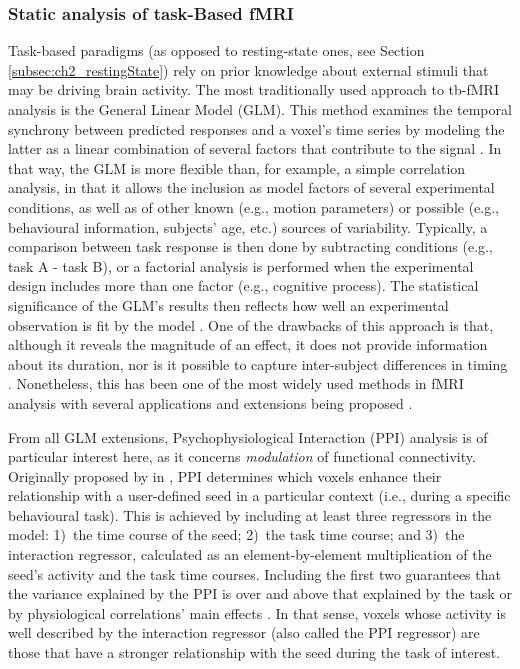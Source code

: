 \subsubsection{Static analysis of task-Based fMRI}

Task-based paradigms (as opposed to resting-state ones, see Section \ref{subsec:ch2_restingState}) rely on prior knowledge about external stimuli that may be driving brain activity. The most traditionally used approach to tb-fMRI analysis is the General Linear Model (GLM). This method examines the temporal synchrony between predicted responses and a voxel’s time series by modeling the latter as a linear combination of several factors that contribute to the signal \citep{Friston1995a}. In that way, the GLM is more flexible than, for example, a simple correlation analysis, in that it allows the inclusion as model factors of several experimental conditions, as well as of other known (e.g., motion parameters) or possible (e.g., behavioural information, subjects’ age, etc.) sources of variability. Typically, a comparison between task response is then done by subtracting conditions (e.g., task A - task B), or a factorial analysis is performed when the experimental design includes more than one factor (e.g., cognitive process). The statistical significance of the GLM’s results then reflects how well an experimental observation is fit by the model \citep{Worsley1995}. One of the drawbacks of this approach is that, although it reveals the magnitude of an effect, it does not provide information about its duration, nor is it possible to capture inter-subject differences in timing \citep{Robinson2009}. Nonetheless, this has been one of the most widely used methods in fMRI analysis with several applications and extensions being proposed \citep{Dale1999, Glover1999, Goldman2000, Laufs2003}.

From all GLM extensions, Psychophysiological Interaction (PPI) analysis is of particular interest here, as it concerns \textit{modulation} of functional connectivity. Originally proposed by \citeauthor{Friston1997} in \citeyear{Friston1997}, PPI determines which voxels enhance their relationship with a user-defined seed in a particular context (i.e., during a specific behavioural task). This is achieved by including at least three regressors in the model: 1)~the time course of the seed; 2)~the task time course; and 3)~the interaction regressor, calculated as an element-by-element multiplication of the seed’s activity and the task time courses. Including the first two guarantees that the variance explained by the PPI is over and above that explained by the task or by physiological correlations’ main effects \citep{OReilly2012a}. In that sense, voxels whose activity is well described by the interaction regressor (also called the PPI regressor) are those that have a stronger relationship with the seed during the task of interest. 

